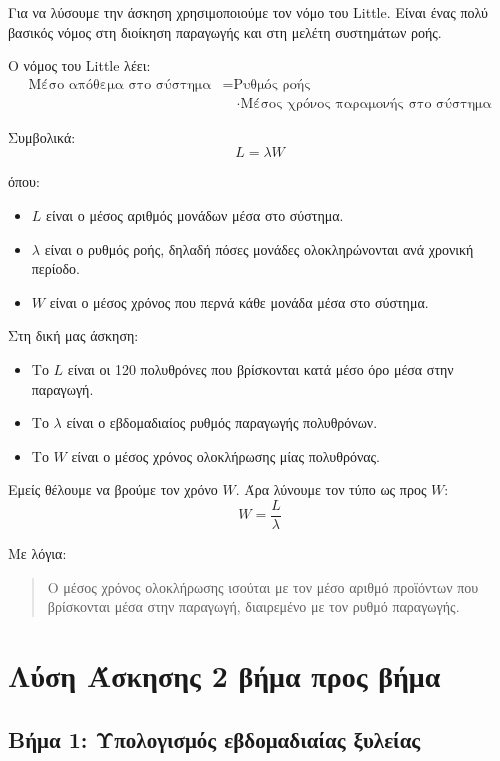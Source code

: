 \documentclass[12pt,a4paper]{article}
\begin{document}
Για να λύσουμε την άσκηση χρησιμοποιούμε τον νόμο του Little. Είναι ένας πολύ βασικός νόμος στη διοίκηση παραγωγής και στη μελέτη συστημάτων ροής.

Ο νόμος του Little λέει:
\begin{align*}
\text{Μέσο απόθεμα στο σύστημα}
&= \text{Ρυθμός ροής} \\
&\quad \cdot \text{Μέσος χρόνος παραμονής στο σύστημα}
\end{align*}

Συμβολικά:
\[
L=\lambda W
\]

όπου:

\begin{itemize}
    \item \(L\) είναι ο μέσος αριθμός μονάδων μέσα στο σύστημα.
    \item \(\lambda\) είναι ο ρυθμός ροής, δηλαδή πόσες μονάδες ολοκληρώνονται ανά χρονική περίοδο.
    \item \(W\) είναι ο μέσος χρόνος που περνά κάθε μονάδα μέσα στο σύστημα.
\end{itemize}

Στη δική μας άσκηση:

\begin{itemize}
    \item Το \(L\) είναι οι 120 πολυθρόνες που βρίσκονται κατά μέσο όρο μέσα στην παραγωγή.
    \item Το \(\lambda\) είναι ο εβδομαδιαίος ρυθμός παραγωγής πολυθρόνων.
    \item Το \(W\) είναι ο μέσος χρόνος ολοκλήρωσης μίας πολυθρόνας.
\end{itemize}

Εμείς θέλουμε να βρούμε τον χρόνο \(W\). Άρα λύνουμε τον τύπο ως προς \(W\):
\[
W=\frac{L}{\lambda}
\]

Με λόγια:

\begin{quote}
Ο μέσος χρόνος ολοκλήρωσης ισούται με τον μέσο αριθμό προϊόντων που βρίσκονται μέσα στην παραγωγή, διαιρεμένο με τον ρυθμό παραγωγής.
\end{quote}

\section{Λύση Άσκησης 2 βήμα προς βήμα}

\subsection{Βήμα 1: Υπολογισμός εβδομαδιαίας ξυλείας}
\end{document}
